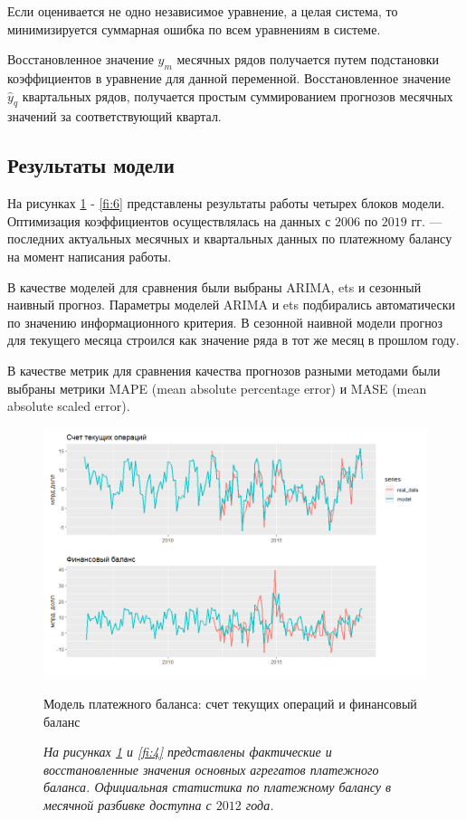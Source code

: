 \documentclass[a4paper, 14pt]{extarticle}
\begin{document}
Если оценивается не одно независимое уравнение, а целая система, то минимизируется суммарная ошибка по всем уравнениям в системе.

Восстановленное значение $\hat y_m$ месячных рядов получается путем подстановки коэффициентов в уравнение для данной переменной.
Восстановленное значение $\hat y_q$ квартальных рядов, получается простым суммированием прогнозов месячных значений за соответствующий квартал.

\subsection{Результаты модели}

На рисунках \ref{fi:3} - \ref{fi:6} представлены результаты работы четырех блоков модели. 
Оптимизация коэффициентов осуществлялась на данных с $2006$ по $2019$ гг. — последних актуальных месячных и квартальных данных по платежному балансу на момент написания работы.

В качестве моделей для сравнения были выбраны ARIMA, ets и сезонный наивный прогноз.
Параметры моделей ARIMA и ets подбирались автоматически по значению информационного критерия. 
В сезонной наивной модели прогноз для текущего месяца строился как значение ряда в тот же месяц в прошлом году.

В качестве метрик для сравнения качества прогнозов разными методами были выбраны метрики MAPE (mean absolute percentage error) и MASE (mean absolute scaled error).

\newpage 

\begin{figure}[htp!]
\centering
\includegraphics[width=19cm]{cur_fin.png}
\captionsetup{justification=centering,margin=0.5cm}
\caption{Модель платежного баланса: счет текущих операций и финансовый баланс}\label{fi:3}
\captionsetup{margin=0cm}
\caption*{\textit{На рисунках \ref{fi:3} и \ref{fi:4} представлены фактические и восстановленные значения основных агрегатов платежного баланса. 
Официальная статистика по платежному балансу в месячной разбивке доступна с $2012$ года.}}
\end{figure}
\end{document}
